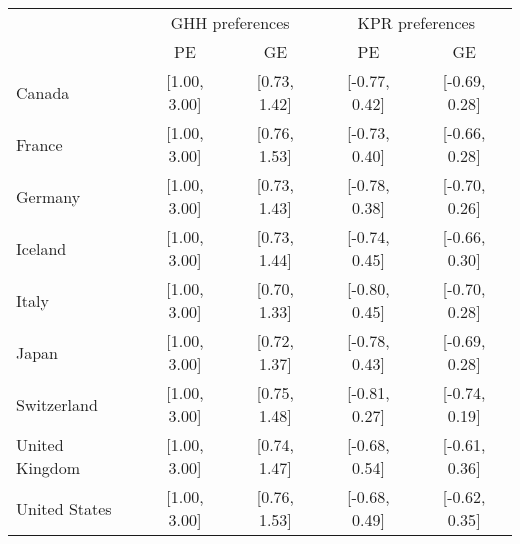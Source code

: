 \begin{tabular}{lcccc} 
& \multicolumn{2}{c}{GHH preferences}   & \multicolumn{2}{c}{KPR preferences}   \tabularnewline 
& PE                & GE                & PE                & GE                \tabularnewline 
\hline 
\hline 
Canada & {[}1.00, 3.00{]} & {[}0.73, 1.42{]} & {[}-0.77, 0.42{]} & {[}-0.69, 0.28{]} \tabularnewline 
France & {[}1.00, 3.00{]} & {[}0.76, 1.53{]} & {[}-0.73, 0.40{]} & {[}-0.66, 0.28{]} \tabularnewline 
Germany & {[}1.00, 3.00{]} & {[}0.73, 1.43{]} & {[}-0.78, 0.38{]} & {[}-0.70, 0.26{]} \tabularnewline 
Iceland & {[}1.00, 3.00{]} & {[}0.73, 1.44{]} & {[}-0.74, 0.45{]} & {[}-0.66, 0.30{]} \tabularnewline 
Italy & {[}1.00, 3.00{]} & {[}0.70, 1.33{]} & {[}-0.80, 0.45{]} & {[}-0.70, 0.28{]} \tabularnewline 
Japan & {[}1.00, 3.00{]} & {[}0.72, 1.37{]} & {[}-0.78, 0.43{]} & {[}-0.69, 0.28{]} \tabularnewline 
Switzerland & {[}1.00, 3.00{]} & {[}0.75, 1.48{]} & {[}-0.81, 0.27{]} & {[}-0.74, 0.19{]} \tabularnewline 
United Kingdom & {[}1.00, 3.00{]} & {[}0.74, 1.47{]} & {[}-0.68, 0.54{]} & {[}-0.61, 0.36{]} \tabularnewline 
United States & {[}1.00, 3.00{]} & {[}0.76, 1.53{]} & {[}-0.68, 0.49{]} & {[}-0.62, 0.35{]} \tabularnewline 
\hline 
\end{tabular} 
